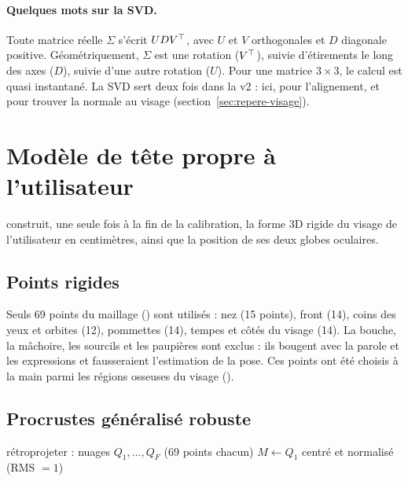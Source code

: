 \paragraph{Quelques mots sur la SVD.} Toute matrice réelle $\Sigma$ s'écrit $U D V^{\top}$, avec $U$ et $V$ orthogonales et $D$ diagonale positive. Géométriquement, $\Sigma$ est une rotation ($V^{\top}$), suivie d'étirements le long des axes ($D$), suivie d'une autre rotation ($U$). Pour une matrice $3\times3$, le calcul est quasi instantané. La SVD sert deux fois dans la v2 : ici, pour l'alignement, et pour trouver la normale au visage (section~\ref{sec:repere-visage}).

\section{Modèle de tête propre à l'utilisateur}
\label{sec:headmodel}

 construit, une seule fois à la fin de la calibration, la forme 3D rigide du visage de l'utilisateur en centimètres, ainsi que la position de ses deux globes oculaires.

\subsection{Points rigides}

Seuls 69 points du maillage () sont utilisés : nez (15 points), front (14), coins des yeux et orbites (12), pommettes (14), tempes et côtés du visage (14). La bouche, la mâchoire, les sourcils et les paupières sont exclus : ils bougent avec la parole et les expressions et fausseraient l'estimation de la pose. Ces points ont été choisis à la main parmi les régions osseuses du visage (\empi).

\subsection{Procrustes généralisé robuste}

\begin{algorithm}[H]
\caption{Construction de la forme moyenne ()}
rétroprojeter : nuages $Q_1, \dots, Q_F$ (69 points chacun)\;
$M \leftarrow Q_1$ centré et normalisé (RMS $= 1$)\;
\end{algorithm}


